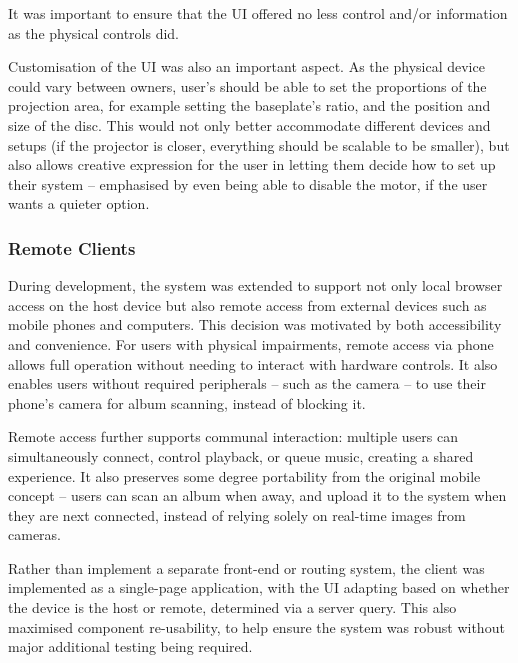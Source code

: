             It was important to ensure that the UI offered no less control and/or information as the physical controls did.
    
            Customisation of the UI was also an important aspect. As the physical device could vary between owners, user's should be able to set the proportions of the projection area, for example setting the baseplate's ratio, and the position and size of the disc. This would not only better accommodate different devices and setups (if the projector is closer, everything should be scalable to be smaller), but also allows creative expression for the user in letting them decide how to set up their system -- emphasised by even being able to disable the motor, if the user wants a quieter option.
        
            \subsubsection{Remote Clients}
    
                During development, the system was extended to support not only local browser access on the host device but also remote access from external devices such as mobile phones and computers. This decision was motivated by both accessibility and convenience. For users with physical impairments, remote access via phone allows full operation without needing to interact with hardware controls. It also enables users without required peripherals -- such as the camera -- to use their phone’s camera for album scanning, instead of blocking it.
    
                Remote access further supports communal interaction: multiple users can simultaneously connect, control playback, or queue music, creating a shared experience. It also preserves some degree portability from the original mobile concept -- users can scan an album when away, and upload it to the system when they are next connected, instead of relying solely on real-time images from cameras.
                
                Rather than implement a separate front-end or routing system, the client was implemented as a single-page application, with the UI adapting based on whether the device is the host or remote, determined via a server query. This also maximised component re-usability, to help ensure the system was robust without major additional testing being required.
    
